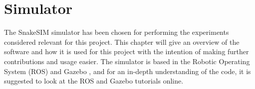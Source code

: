 \chapter{Simulator}\label{chapter:simulator}

The SnakeSIM simulator \cite{sanfilippo2018snakesim} has been chosen for performing the experiments considered relevant for this project. This chapter will give an overview of the software and how it is used for this project with the intention of making further contributions and usage easier. The simulator is based in the Robotic Operating System (ROS) \cite{quigley2009ros} and Gazebo \cite{koenig2004design}, and for an in-depth understanding of the code, it is suggested to look at the ROS and Gazebo tutorials online.




%
%